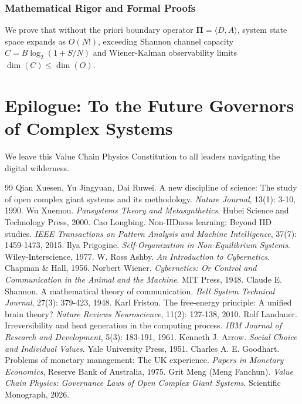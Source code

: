 \documentclass[12pt,a4paper,oneside]{book}
\begin{document}
\subsection*{Mathematical Rigor and Formal Proofs}
We prove that without the priori boundary operator $\mathbf{\Pi} = \langle D, A \rangle$, system state space expands as $O(N!)$, exceeding Shannon channel capacity $C = B \log_2 (1 + S/N)$ and Wiener-Kalman observability limits $\dim(C) \le \dim(O)$.
\clearpage

\chapter*{Epilogue: To the Future Governors of Complex Systems}
We leave this Value Chain Physics Constitution to all leaders navigating the digital wilderness.

\begin{thebibliography}{99}
 Qian Xuesen, Yu Jingyuan, Dai Ruwei. A new discipline of science: The study of open complex giant systems and its methodology. \textit{Nature Journal}, 13(1): 3-10, 1990.
 Wu Xuemou. \textit{Pansystems Theory and Metasynthetics}. Hubei Science and Technology Press, 2000.
 Cao Longbing. Non-IIDness learning: Beyond IID studies. \textit{IEEE Transactions on Pattern Analysis and Machine Intelligence}, 37(7): 1459-1473, 2015.
 Ilya Prigogine. \textit{Self-Organization in Non-Equilibrium Systems}. Wiley-Interscience, 1977.
 W. Ross Ashby. \textit{An Introduction to Cybernetics}. Chapman \& Hall, 1956.
 Norbert Wiener. \textit{Cybernetics: Or Control and Communication in the Animal and the Machine}. MIT Press, 1948.
 Claude E. Shannon. A mathematical theory of communication. \textit{Bell System Technical Journal}, 27(3): 379-423, 1948.
 Karl Friston. The free-energy principle: A unified brain theory? \textit{Nature Reviews Neuroscience}, 11(2): 127-138, 2010.
 Rolf Landauer. Irreversibility and heat generation in the computing process. \textit{IBM Journal of Research and Development}, 5(3): 183-191, 1961.
 Kenneth J. Arrow. \textit{Social Choice and Individual Values}. Yale University Press, 1951.
 Charles A. E. Goodhart. Problems of monetary management: The UK experience. \textit{Papers in Monetary Economics}, Reserve Bank of Australia, 1975.
 Grit Meng (Meng Fanchun). \textit{Value Chain Physics: Governance Laws of Open Complex Giant Systems}. Scientific Monograph, 2026.
\end{thebibliography}
\end{document}
